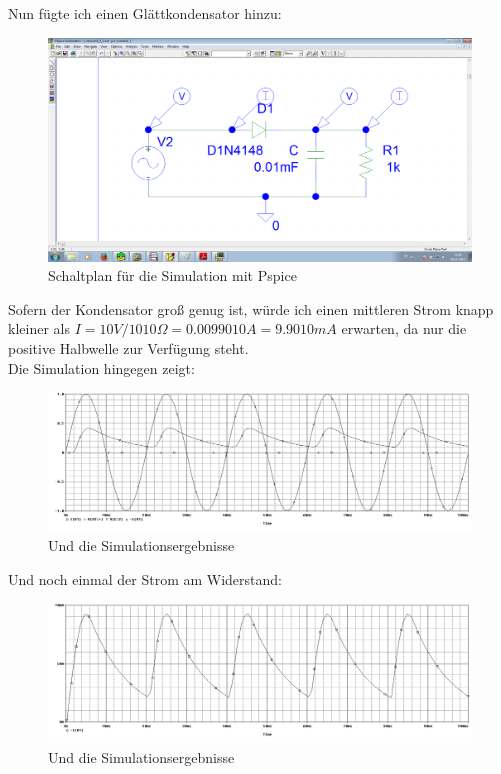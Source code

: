 Nun fügte ich einen Glättkondensator hinzu:
\begin{figure}[H]
	\centering
	\includegraphics[width=\linewidth]{versuch2/spice/v2_5_2_schematic.png}
	\caption{Schaltplan für die Simulation mit Pspice}
\end{figure}
Sofern der Kondensator groß genug ist, würde ich einen mittleren Strom knapp kleiner als $ I=10V/1010\Omega = 0.0099010 A = 9.9010 mA $ erwarten, da nur die positive Halbwelle zur Verfügung steht.\\
Die Simulation hingegen zeigt:
\begin{figure}[H]
	\centering
	\includegraphics[width=\linewidth]{versuch2/spice/v2_5_2_simulation.png}
	\caption{Und die Simulationsergebnisse}
\end{figure}
Und noch einmal der Strom am Widerstand:
\begin{figure}[H]
	\centering
	\includegraphics[width=\linewidth]{versuch2/spice/v2_5_2_strom_simulation.png}
	\caption{Und die Simulationsergebnisse}
\end{figure}
